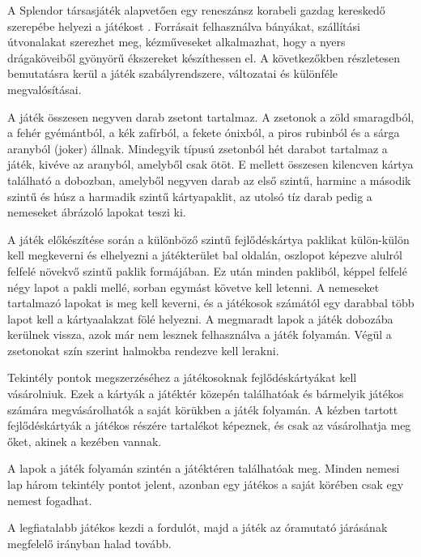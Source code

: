 
A Splendor társasjáték alapvetően egy reneszánsz korabeli gazdag kereskedő szerepébe helyezi a játékost \cite{rulebook}.
Forrásait felhasználva bányákat, szállítási útvonalakat szerezhet meg, kézműveseket
alkalmazhat, hogy a nyers drágaköveiből gyönyörű ékszereket készíthessen el.
A következőkben részletesen bemutatásra kerül a játék szabályrendszere, változatai és különféle megvalósításai.


A játék összesen negyven darab zsetont tartalmaz. A zsetonok a zöld smaragdból, a fehér gyémántból, a kék zafírból, a fekete ónixból, a piros rubinból és a sárga aranyból (joker) állnak. Mindegyik típusú zsetonból hét darabot tartalmaz a játék, kivéve az aranyból, amelyből csak ötöt. E mellett összesen kilencven kártya található a dobozban, amelyből negyven darab az első szintű, harminc a második szintű és húsz a harmadik szintű kártyapaklit, az utolsó tíz darab pedig a nemeseket ábrázoló lapokat teszi ki.

A játék előkészítése során a különböző szintű fejlődéskártya paklikat külön-külön kell megkeverni és elhelyezni a játékterület bal oldalán, oszlopot képezve alulról felfelé növekvő szintű paklik formájában.
Ez után minden pakliból, képpel felfelé négy lapot a pakli mellé, sorban
egymást követve kell letenni.
A nemeseket tartalmazó lapokat is meg kell keverni, és a játékosok számától egy darabbal több lapot kell a kártyaalakzat fölé helyezni. A megmaradt lapok a játék dobozába kerülnek vissza, azok már nem lesznek
felhasználva a játék folyamán. Végül a zsetonokat szín szerint halmokba rendezve kell lerakni.


Tekintély pontok megszerzéséhez a játékosoknak fejlődéskártyákat kell vásárolniuk. Ezek a kártyák a játéktér közepén találhatóak és bármelyik játékos számára megvásárolhatók a saját körükben a játék folyamán. A kézben tartott fejlődéskártyák a játékos részére tartalékot képeznek, és csak az vásárolhatja meg őket, akinek a kezében vannak.


A lapok a játék folyamán szintén a játéktéren találhatóak meg. Minden nemesi lap három tekintély pontot jelent, azonban egy játékos a saját körében csak egy nemest fogadhat.


A legfiatalabb játékos kezdi a fordulót, majd a játék az óramutató járásának megfelelő irányban halad tovább.

